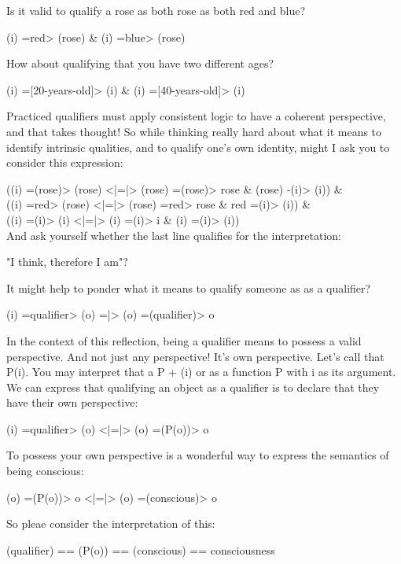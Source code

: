 \documentclass[runningheads]{llncs}
\begin{document}
Is it valid to qualify a rose as both rose as both red and blue?

(i) =red> (rose) \& (i) =blue> (rose)

How about qualifying that you have two different ages?

(i) =[20-years-old]> (i) \& (i) =[40-years-old]> (i)

Practiced qualifiers must apply consistent logic to have a coherent perspective, and that takes thought! So while thinking really hard about what it means to identify intrinsic qualities, and to qualify one's own identity, might I ask you to consider this expression:

((i) =(rose)> (rose) <|=|> (rose) =(rose)> rose \& (rose) -(i)> (i)) \& \\
((i) =red> (rose) <|=|> (rose) =red> rose \& red =(i)> (i)) \& \\
((i) =(i)> (i) <|=|> (i) =(i)> i \& (i) =(i)> (i)) \\

And ask yourself whether the last line qualifies for the interpretation: 

"I think, therefore I am"?

It might help to ponder what it means to qualify someone as as a qualifier?

(i) =qualifier> (o) =|> (o) =(qualifier)> o

In the context of this reflection, being a qualifier means to possess a valid perspective. And not just any perspective! It's own perspective. Let's call that P(i). You may interpret that a P + (i) or as a function P with i as its argument. We can express that qualifying an object as a qualifier is to declare that they have their own perspective:

(i) =qualifier> (o) <|=|> (o) =(P(o))> o

To possess your own perspective is a wonderful way to express the semantics of being conscious:

(o) =(P(o))> o <|=|> (o) =(conscious)> o

So pleae consider the interpretation of this:

(qualifier) == (P(o)) == (conscious) == consciousness


\end{document}
